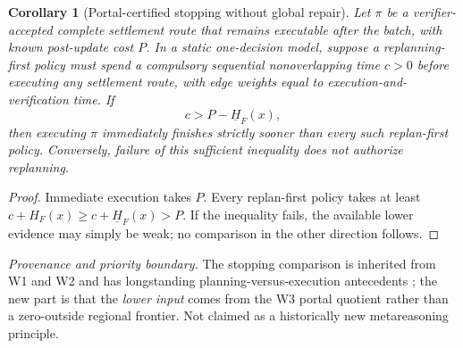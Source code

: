\documentclass[11pt,letterpaper]{article}
\newtheorem{corollary}[theorem]{Corollary}
\newcommand{\attrib}[1]{\par\noindent\textit{Provenance and priority boundary.} #1\par}
\begin{document}
\begin{corollary}[Portal-certified stopping without global repair]\label{cor:stop}
Let $\pi$ be a verifier-accepted complete settlement route that remains executable after the batch, with known post-update cost $P$. In a static one-decision model, suppose a replanning-first policy must spend a compulsory sequential nonoverlapping time $c>0$ before executing any settlement route, with edge weights equal to execution-and-verification time. If
\[
\boxed{c>P-\underline H_F(x),}
\]
then executing $\pi$ immediately finishes strictly sooner than every such replan-first policy. Conversely, failure of this sufficient inequality does not authorize replanning.
\end{corollary}
\begin{proof}
Immediate execution takes $P$. Every replan-first policy takes at least $c+H_F(x)\ge c+\underline H_F(x)>P$. If the inequality fails, the available lower evidence may simply be weak; no comparison in the other direction follows.
\end{proof}
\attrib{The stopping comparison is inherited from W1 and W2 and has longstanding planning-versus-execution antecedents \cite{W1,W2,Shekhar,Russell}; the new part is that the \emph{lower input} comes from the W3 portal quotient rather than a zero-outside regional frontier. Not claimed as a historically new metareasoning principle.}
\end{document}
